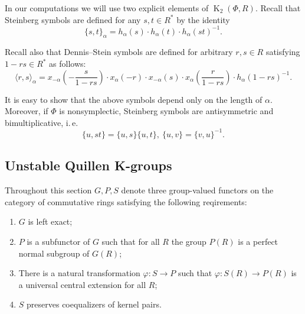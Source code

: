 \documentclass[oneside, 8pt]{amsart}
\theoremstyle{remark}
\theoremstyle{definition}
\DeclareMathOperator{\K}{K}
\numberwithin{equation}{section}
\begin{document}
In our computations we will use two explicit elements of $\K_2(\Phi, R)$. Recall that Steinberg symbols are defined for any $s, t \in R^*$ by the identity
\[ \{ s, t \}_\alpha = h_\alpha(s) \cdot h_\alpha(t) \cdot h_\alpha(st)^{-1}. \]

Recall also that Dennis--Stein symbols are defined for arbitrary $r, s\in R$ satisfying $1 - rs \in R^*$ as follows:
\begin{equation} \label{eq:dennis-stein}
 \langle r,s \rangle _ \alpha = x_{-\alpha}\left(-\frac{s}{1 - rs}\right) \cdot x_{\alpha}(-r) \cdot x_{-\alpha}(s) \cdot x_{\alpha}\left(\frac{r}{1-rs}\right) \cdot h_{\alpha}(1 - rs)^{-1}.
\end{equation} 

It is easy to show that the above symbols depend only on the length of $\alpha$.
Moreover, if $\Phi$ is nonsymplectic, Steinberg symbols are antisymmetric and bimultiplicative, i.\,e. \begin{equation} \label{eq:symbol-properties} \{ u, st \} = \{ u, s\} \{ u, t \}, \ \{ u, v \} = \{ v, u\}^{-1}. \end{equation}

\begin{comment}
Suppose for a moment that $\langle \alpha, \beta \rangle = -1$ and  $\langle \beta, \alpha \rangle = -1$ then
\[ \{s, t^{-1} \} = \{s,  t^{-1}\}_\alpha = \{t, s^{-1} \}_\beta^{-1} = \{s^{-1}, t\} \]
In particular, $\{s, s^{-1}\} = \{s, s^{-1}\}^{-1}$ 
\end{comment}
\subsection{Unstable Quillen K-groups} \label{sec:quillen}
Throughout this section $G, P, S$ denote three group-valued functors on the category of commutative rings satisfying the following reqirements:
\begin{enumerate}
 \item \label{req:left-exact} $G$ is left exact;
 \item \label{req:subfunc} $P$ is a subfunctor of $G$ such that for all $R$ the group $P(R)$ is a perfect normal subgroup of $G(R)$;
 \item \label{req:uce} There is a natural transformation $\varphi \colon S \to P$ such that $ \varphi \colon S(R) \to P(R)$ is a universal central extension for all $R$;
 \item \label{req:coeq} $S$ preserves coequalizers of kernel pairs.
\end{enumerate}
\end{document}
